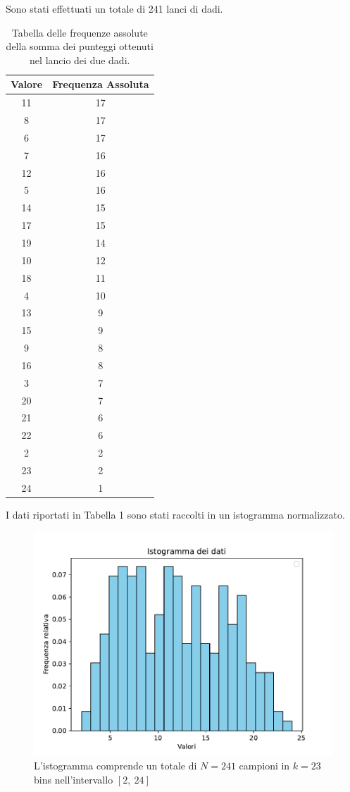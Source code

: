 Sono stati effettuati un totale di 241 lanci di dadi. 

\begin{table}[H]
	\centering
	\begin{tabular}{|c|c|}
		\hline
		\textbf{Valore} & \textbf{Frequenza Assoluta} \\
		\hline
		11 & 17 \\
		\hline
		8 & 17 \\
		\hline
		6 & 17 \\
		\hline
		7 & 16 \\
		\hline
		12 & 16 \\
		\hline
		5 & 16 \\
		\hline
		14 & 15 \\
		\hline
		17 & 15 \\
		\hline
		19 & 14 \\
		\hline
		10 & 12 \\
		\hline
		18 & 11 \\
		\hline
		4 & 10 \\
		\hline
		13 & 9 \\
		\hline
		15 & 9 \\
		\hline
		9 & 8 \\
		\hline
		16 & 8 \\
		\hline
		3 & 7 \\
		\hline
		20 & 7 \\
		\hline
		21 & 6 \\
		\hline
		22 & 6 \\
		\hline
		2 & 2 \\
		\hline
		23 & 2 \\
		\hline
		24 & 1 \\
		\hline
	\end{tabular}
	\caption{Tabella delle frequenze assolute della somma dei punteggi ottenuti nel lancio dei due dadi.}
	\label{tab:frequenze_assolute}
\end{table}


I dati riportati in Tabella 1 sono stati raccolti in un istogramma normalizzato.

\begin{figure}[H]
	\centering
	\includegraphics[width=1\textwidth]{istogramma2.pdf}
	\caption{L'istogramma comprende un totale di $N=241$ campioni in $k=23$ bins nell'intervallo $[2,\ 24]$}
\end{figure}

